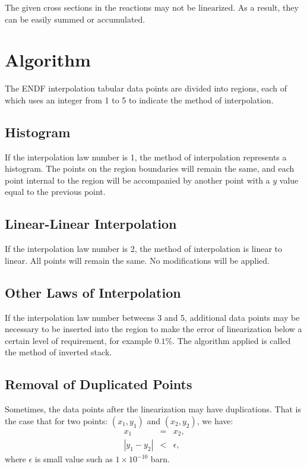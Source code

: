 The given cross sections in the reactions may not be linearized. As a result, they can be easily summed or accumulated. 

\section{Algorithm}
The ENDF interpolation tabular data points are divided into regions, each of which uses an integer from 1 to 5 to indicate the method of interpolation. 

\subsection{Histogram}
If the interpolation law number is 1, the method of interpolation represents a histogram. The points on the region boundaries will remain the same, and each point internal to the region will be accompanied by another point with a $y$ value equal to the previous point. 

\subsection{Linear-Linear Interpolation}
If the interpolation law number is 2, the method of interpolation is linear to linear. All points will remain the same. No modifications will be applied.

\subsection{Other Laws of Interpolation}
If the interpolation law number betweens 3 and 5, additional data points may be necessary to be inserted into the region to make the error of linearization below a certain level of requirement, for example $0.1\%$. The algorithm applied is called the method of inverted stack. 

\subsection{Removal of Duplicated Points}
Sometimes, the data points after the linearization may have duplications. That is the case that for two points: $(x_1,y_1)$ and $(x_2,y_2)$, we have:
\begin{eqnarray}
x_1 &=& x_2,\\
|y_1-y_2| &<& \epsilon,
\end{eqnarray}
where $\epsilon$ is small value such as $1\times10^{-10}$ barn.

